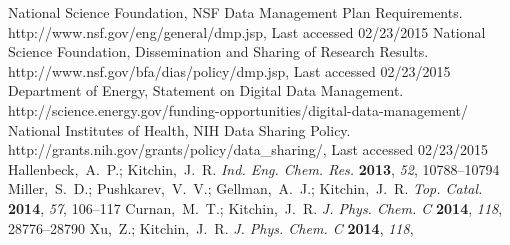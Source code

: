 \documentclass[journal=accacs,manuscript=article,email=true]{achemso}
\begin{document}
\begin{mcitethebibliography}{35}
{National Science Foundation}, {NSF} Data Management Plan Requirements.
  http://www.nsf.gov/eng/general/dmp.jsp, Last accessed 02/23/2015\relax
\mciteBstWouldAddEndPuncttrue
\mciteSetBstMidEndSepPunct{\mcitedefaultmidpunct}
{\mcitedefaultendpunct}{\mcitedefaultseppunct}\relax
\EndOfBibitem
{}
{National Science Foundation}, Dissemination and Sharing of Research Results.
  http://www.nsf.gov/bfa/dias/policy/dmp.jsp, Last accessed 02/23/2015\relax
\mciteBstWouldAddEndPuncttrue
\mciteSetBstMidEndSepPunct{\mcitedefaultmidpunct}
{\mcitedefaultendpunct}{\mcitedefaultseppunct}\relax
\EndOfBibitem
{}
{Department of Energy}, Statement on Digital Data Management.
  http://science.energy.gov/funding-opportunities/digital-data-management/\relax
\mciteBstWouldAddEndPuncttrue
\mciteSetBstMidEndSepPunct{\mcitedefaultmidpunct}
{\mcitedefaultendpunct}{\mcitedefaultseppunct}\relax
\EndOfBibitem
{}
{National Institutes of Health}, {NIH} Data Sharing Policy.
  http://grants.nih.gov/grants/policy/data\_sharing/, Last accessed
  02/23/2015\relax
\mciteBstWouldAddEndPuncttrue
\mciteSetBstMidEndSepPunct{\mcitedefaultmidpunct}
{\mcitedefaultendpunct}{\mcitedefaultseppunct}\relax
\EndOfBibitem
{}
Hallenbeck,~A.~P.; Kitchin,~J.~R. \emph{Ind. Eng. Chem. Res.} \textbf{2013},
  \emph{52}, 10788--10794\relax
\mciteBstWouldAddEndPuncttrue
\mciteSetBstMidEndSepPunct{\mcitedefaultmidpunct}
{\mcitedefaultendpunct}{\mcitedefaultseppunct}\relax
\EndOfBibitem
{}
Miller,~S.~D.; Pushkarev,~V.~V.; Gellman,~A.~J.; Kitchin,~J.~R. \emph{Top.
  Catal.} \textbf{2014}, \emph{57}, 106--117\relax
\mciteBstWouldAddEndPuncttrue
\mciteSetBstMidEndSepPunct{\mcitedefaultmidpunct}
{\mcitedefaultendpunct}{\mcitedefaultseppunct}\relax
\EndOfBibitem
{}
Curnan,~M.~T.; Kitchin,~J.~R. \emph{J. Phys. Chem. C} \textbf{2014},
  \emph{118}, 28776--28790\relax
\mciteBstWouldAddEndPuncttrue
\mciteSetBstMidEndSepPunct{\mcitedefaultmidpunct}
{\mcitedefaultendpunct}{\mcitedefaultseppunct}\relax
\EndOfBibitem
{}
Xu,~Z.; Kitchin,~J.~R. \emph{J. Phys. Chem. C} \textbf{2014}, \emph{118},

\end{mcitethebibliography}
\end{document}

